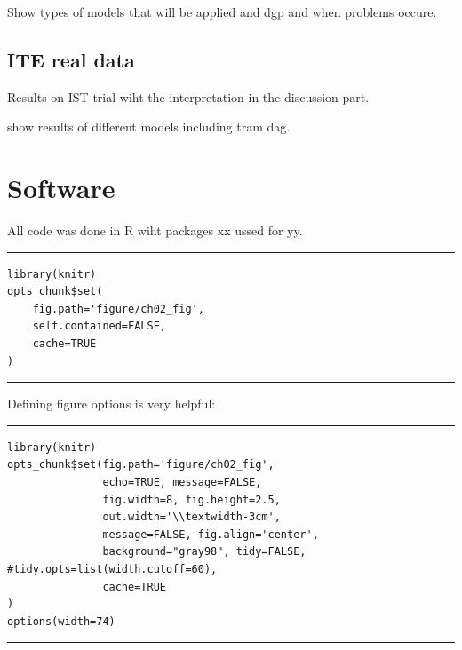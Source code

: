 Show types of models that will be applied and dgp and when problems occure.

\subsection{ITE real data}

Results on IST trial wiht the interpretation in the discussion part.

show results of different models including tram dag.



\section{Software}

All code was done in R wiht packages xx ussed for yy.

\bigskip

\hrule
\begin{knitrout}
\color{fgcolor}\begin{kframe}
\begin{verbatim}
library(knitr)
opts_chunk$set(
    fig.path='figure/ch02_fig',
    self.contained=FALSE,
    cache=TRUE
)
\end{verbatim}
\end{kframe}
\end{knitrout}
\hrule

\bigskip

Defining figure options is very helpful:


\bigskip


\hrule
\begin{knitrout}
\color{fgcolor}\begin{kframe}
\begin{verbatim}
library(knitr)
opts_chunk$set(fig.path='figure/ch02_fig',
               echo=TRUE, message=FALSE,
               fig.width=8, fig.height=2.5,
               out.width='\\textwidth-3cm',
               message=FALSE, fig.align='center',
               background="gray98", tidy=FALSE, #tidy.opts=list(width.cutoff=60),
               cache=TRUE
)
options(width=74)
\end{verbatim}
\end{kframe}
\end{knitrout}
\hrule

